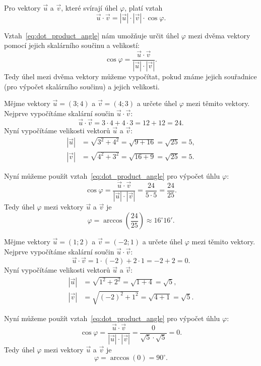 \begin{definition}\label{def:dot_product_angle}
    Pro vektory $\vec{u}$ a $\vec{v}$, které svírají úhel $\varphi$, platí vztah
    \begin{equation}\label{eq:dot_product_angle}
        \vec{u} \cdot \vec{v} = |\vec{u}| \cdot |\vec{v}| \cdot \cos\varphi.
    \end{equation}
\end{definition}

\begin{remark}\label{rem:dot_product_angle}
    Vztah~\eqref{eq:dot_product_angle} nám umožňuje určit úhel $\varphi$ mezi dvěma vektory pomocí jejich skalárního součinu a velikostí:
    \[
    \cos\varphi = \frac{\vec{u} \cdot \vec{v}}{|\vec{u}| \cdot |\vec{v}|}.
    \]
    Tedy úhel mezi dvěma vektory můžeme vypočítat, pokud známe jejich souřadnice (pro výpočet skalárního součinu) a jejich velikosti.
\end{remark}

\begin{example}\label{exa:orthogonal_vectors_angle1}
    Mějme vektory $\vec{u} = (3;4)$ a $\vec{v} = (4;3)$ a určete úhel $\varphi$ mezi těmito vektory.
    Nejprve vypočítáme skalární součin $\vec{u} \cdot \vec{v}$:
    \[
    \vec{u} \cdot \vec{v} = 3 \cdot 4 + 4 \cdot 3 = 12 + 12 = 24.
    \]
    Nyní vypočítáme velikosti vektorů $\vec{u}$ a $\vec{v}$:
    \begin{align*}
    |\vec{u}| &= \sqrt{3^2 + 4^2} = \sqrt{9 + 16} = \sqrt{25} = 5,\\
    |\vec{v}| &= \sqrt{4^2 + 3^2} = \sqrt{16 + 9} = \sqrt{25} = 5.
    \end{align*}

    Nyní můžeme použít vztah~\eqref{eq:dot_product_angle} pro výpočet úhlu $\varphi$:
    \[
    \cos\varphi = \frac{\vec{u} \cdot \vec{v}}{|\vec{u}| \cdot |\vec{v}|} = \frac{24}{5 \cdot 5} = \frac{24}{25}.
    \]
    Tedy úhel $\varphi$ mezi vektory $\vec{u}$ a $\vec{v}$ je
    \[
    \varphi = \arccos\left(\frac{24}{25}\right) \approx 16^\circ 16'.
    \]
\end{example}

\begin{example}\label{exa:orthogonal_vectors_angle2}
    Mějme vektory $\vec{u} = (1;2)$ a $\vec{v} = (-2;1)$ a určete úhel $\varphi$ mezi těmito vektory.
    Nejprve vypočítáme skalární součin $\vec{u} \cdot \vec{v}$:
    \[
    \vec{u} \cdot \vec{v} = 1 \cdot (-2) + 2 \cdot 1 = -2 + 2 = 0.
    \]
    Nyní vypočítáme velikosti vektorů $\vec{u}$ a $\vec{v}$:
    \begin{align*}
    |\vec{u}| &= \sqrt{1^2 + 2^2} = \sqrt{1 + 4} = \sqrt{5},\\
    |\vec{v}| &= \sqrt{(-2)^2 + 1^2} = \sqrt{4 + 1} = \sqrt{5}.
    \end{align*}

    Nyní můžeme použít vztah~\eqref{eq:dot_product_angle} pro výpočet úhlu $\varphi$:
    \[
    \cos\varphi = \frac{\vec{u} \cdot \vec{v}}{|\vec{u}| \cdot |\vec{v}|} = \frac{0}{\sqrt{5} \cdot \sqrt{5}} = 0.
    \]
    Tedy úhel $\varphi$ mezi vektory $\vec{u}$ a $\vec{v}$ je
    \[
    \varphi = \arccos(0) = 90^\circ.
    \]
\end{example}

